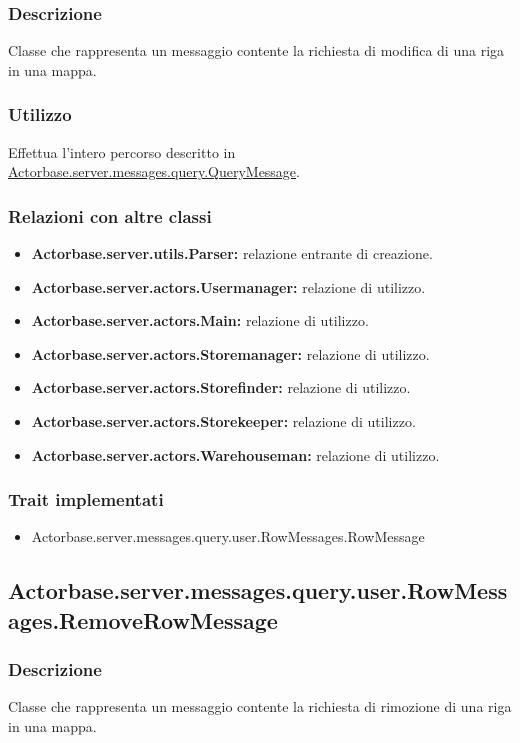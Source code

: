 \documentclass[a4paper]{article}
\begin{document}
			\subsubsection{Descrizione}
				Classe che rappresenta un messaggio contente la richiesta di modifica di una riga in una mappa.
				
			\subsubsection{Utilizzo}
				Effettua l'intero percorso descritto in \hyperref[QueryMessage]{Actorbase.server.messages.query.QueryMessage}.
				
			\subsubsection{Relazioni con altre classi}
				\begin{itemize}
					\item \textbf{Actorbase.server.utils.Parser:} relazione entrante di creazione.
					\item \textbf{Actorbase.server.actors.Usermanager:} relazione di utilizzo.
					\item \textbf{Actorbase.server.actors.Main:} relazione di utilizzo.
					\item \textbf{Actorbase.server.actors.Storemanager:} relazione di utilizzo.
					\item \textbf{Actorbase.server.actors.Storefinder:} relazione di utilizzo.
					\item \textbf{Actorbase.server.actors.Storekeeper:} relazione di utilizzo.
					\item \textbf{Actorbase.server.actors.Warehouseman:} relazione di utilizzo.
				\end{itemize}
			\subsubsection{Trait implementati}
				\begin{itemize}
					\item Actorbase.server.messages.query.user.RowMessages.RowMessage
				\end{itemize}
				
		\subsection{Actorbase.server.messages.query.user.RowMessages.RemoveRowMessage}
			\subsubsection{Descrizione}
				Classe che rappresenta un messaggio contente la richiesta di rimozione di una riga in una mappa.
				
\end{document}
